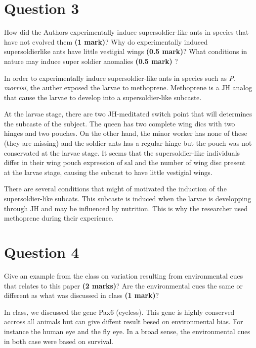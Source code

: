 \documentclass[letterpaper,12pt]{article}
\newenvironment{myindentpar}[1]%
{\begin{list}{}%
          {\setlength{\leftmargin}{#1}}%
          \item[]%
}
{\end{list}}
\begin{document}
\section{Question 3}

How did the Authors experimentally induce supersoldier-like ants in species that have not evolved them \textbf{(1 mark)}? Why do experimentally induced supersoldierlike ants have little vestigial wings \textbf{(0.5 mark)}? What conditions in nature may induce super soldier anomalies \textbf{(0.5 mark)} ?
\vspace*{20px}

\begin{myindentpar}{0.5cm}
In order to experimentally induce supersoldier-like ants in species such as \textit{P. morrisi}, the auther exposed the larvae to methoprene. Methoprene is a JH analog that cause the larvae to develop into a supersoldier-like subcaste.

At the larvae stage, there are two JH-meditated switch point that will determines the subcaste of the subject. The queen has two complete wing dics with two hinges and two pouches. On the other hand, the minor worker has none of these (they are missing) and the soldier ants has a regular hinge but the pouch was not conservated at the larvae stage. It seems that the supersoldier-like individuals differ in their wing pouch expression of sal and the number of wing disc present at the larvae stage, causing the subcast to have little vestigial wings. 

There are several conditions that might of motivated the induction of the supersoldier-like subcats. This subcaste is induced when the larvae is developping through JH and may be influenced by nutrition. This is why the researcher used methoprene during their experience.
\end{myindentpar}



\section{Question 4}

Give an example from the class on variation resulting from environmental cues that relates to this paper \textbf{(2 marks)}? Are the environmental cues the same or different as what was discussed in class \textbf{(1 mark)}?

\begin{myindentpar}{0.5cm}
In class, we discussed the gene Pax6 (eyeless). This gene is highly conserved accross all animals but can give diffent result besed on environmental bias. For instance the human eye and the fly eye. In a broad sense, the environmental cues in both case were based on survival.
\end{myindentpar}
\end{document}
